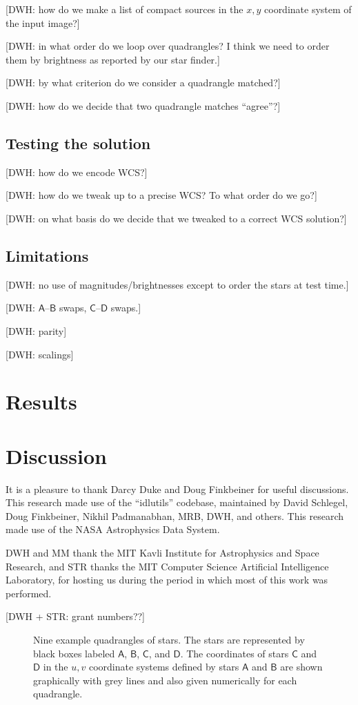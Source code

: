 \documentclass[12pt,preprint]{aastex}
\newcommand{\starlabel}[1]{\mathsf{#1}}
\newcommand{\AAA}{\starlabel{A}}
\newcommand{\BBB}{\starlabel{B}}
\newcommand{\CCC}{\starlabel{C}}
\newcommand{\DDD}{\starlabel{D}}
\begin{document}
[DWH: how do we make a list of compact sources in the $x,y$ coordinate
  system of the input image?]

[DWH: in what order do we loop over quadrangles?  I think we need to
  order them by brightness as reported by our star finder.]

[DWH: by what criterion do we consider a quadrangle matched?]

[DWH: how do we decide that two quadrangle matches ``agree''?]

\subsection{Testing the solution}

[DWH: how do we encode WCS?]

[DWH: how do we tweak up to a precise WCS?  To what order do we go?]

[DWH: on what basis do we decide that we tweaked to a correct WCS
  solution?]

\subsection{Limitations}

[DWH: no use of magnitudes/brightnesses except to order the stars at
  test time.]

[DWH: $\AAA$--$\BBB$ swaps, $\CCC$--$\DDD$ swaps.]

[DWH: parity]

[DWH: scalings]

\section{Results}

\section{Discussion}

\acknowledgements
It is a pleasure to thank Darcy Duke and Doug Finkbeiner for useful
discussions.  This research made use of the ``idlutils'' codebase,
maintained by David Schlegel, Doug Finkbeiner, Nikhil Padmanabhan,
MRB, DWH, and others.  This research made use of the NASA Astrophysics
Data System.

DWH and MM thank the MIT Kavli Institute for Astrophysics and Space
Research, and STR thanks the MIT Computer Science Artificial
Intelligence Laboratory, for hosting us during the period in which
most of this work was performed.

[DWH + STR: grant numbers??]




\clearpage
\begin{figure}
\caption{Nine example quadrangles of stars.  The stars are represented
  by black boxes labeled $\AAA$, $\BBB$, $\CCC$, and $\DDD$.  The
  coordinates of stars $\CCC$ and $\DDD$ in the $u,v$ coordinate
  systems defined by stars $\AAA$ and $\BBB$ are shown graphically
  with grey lines and also given numerically for each
  quadrangle.\label{fig:quad}}
\end{figure}
\end{document}
